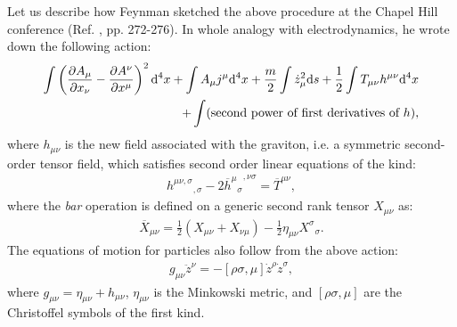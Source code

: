 \documentclass{ws-procs961x669}            %
\begin{document}
Let us describe how Feynman sketched the above procedure at the
Chapel Hill conference (Ref. , pp. 272-276).
In whole analogy with electrodynamics, he wrote down the following
action:
%
\begin{eqnarray}\label{secondOrAction}
\int \left(\frac{\partial A_{\mu}}{\partial x_{\nu}}-\frac{\partial A^{\nu}}{\partial x^{\mu}}\right)^2 {\rm d}^4x + \int A_{\mu}j^{\mu} {\rm d}^4x + \frac{m}{2}\int \dot{z}_{\mu}^2 {\rm d} s + \frac{1}{2}\int T_{\mu\nu}h^{\mu\nu} {\rm d}^4x \nonumber \\
+ \int (\textrm{second power of first derivatives of $h$} ),
\end{eqnarray}
%
where $h_{\mu\nu}$ is the new field associated with the graviton,
i.e. a symmetric second-order tensor field, which satisfies second
order linear equations of the kind:
%
\begin{eqnarray} \label{fieldEq}
{h^{\mu\nu,\sigma}}_{,\sigma} - 2
{{\overline{h}^{\mu}}_{\sigma}}^{,\nu\sigma}=
\overline{T}^{\mu\nu},
\end{eqnarray}
%
where the {\it bar} operation is defined on a generic second rank
tensor $X_{\mu\nu}$ as:
%
\begin{eqnarray} \label{barOperation}
\overline{X}_{\mu\nu}=\frac{1}{2} \left( X_{\mu\nu} + X_{\nu\mu}
\right) - \frac{1}{2} \eta_{\mu\nu} {X^{\sigma}}_{\sigma}.
\end{eqnarray}
%
The equations of motion for particles also follow from the above
action:
%
\begin{eqnarray} \label{particleEq}
g_{\mu\nu} \ddot{z}^{\nu} = -\left[\rho\sigma,\mu
\right]\dot{z}^{\rho}\dot{z}^{\sigma},
\end{eqnarray}
%
where $g_{\mu\nu}=\eta_{\mu\nu}+h_{\mu\nu}$, $\eta_{\mu\nu}$ is
the Minkowski metric, and $\left[\rho\sigma,\mu \right]$ are the
Christoffel symbols of the first kind.
\end{document}
